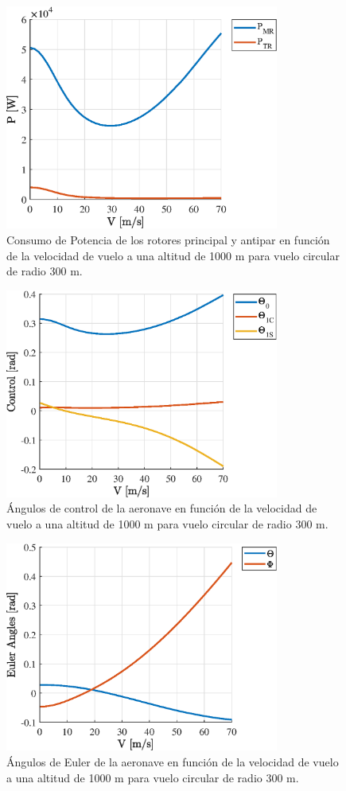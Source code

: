 \begin{figure}
	\centering
	\includegraphics[width=90mm]{graficos/PVC}
	\caption{Consumo de Potencia de los rotores principal y antipar en función de la velocidad de vuelo a una altitud de 1000 m para vuelo circular de radio 300 m.}
	\label{PVC}
\end{figure}
\begin{figure}
	\centering
	\includegraphics[width=90mm]{graficos/ControlVC}
	\caption{Ángulos de control de la aeronave en función de la velocidad de vuelo a una altitud de 1000 m para vuelo circular de radio 300 m.}
	\label{ControlVC}
\end{figure}
\begin{figure}
	\centering
	\includegraphics[width=90mm]{graficos/EulerVC}
	\caption{Ángulos de Euler de la aeronave en función de la velocidad de vuelo a una altitud de 1000 m para vuelo circular de radio 300 m.}
	\label{EulerVC}
\end{figure}

